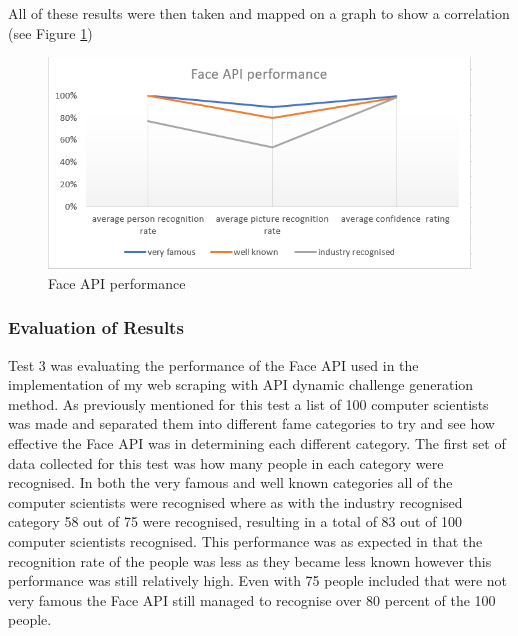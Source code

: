 \documentclass[12pt,a4paper]{article}
\begin{document}
All of these results were then taken and mapped on a graph to show a correlation (see Figure \ref{fer4}) 

\begin{figure}[!ht]
    \centering
    \includegraphics[width=1.0\textwidth]{Figs/faceevalr4.PNG} 
    \caption{Face API performance} 
    \label{fer4}
\end{figure}  



\subsubsection{Evaluation of Results} 
Test 3 was evaluating the performance of the Face API used in the implementation of my web scraping with API dynamic challenge generation method. 
As previously mentioned for this test a list of 100 computer scientists was made and separated them into different fame categories to try and see how effective the Face API was in determining each different category. The first set of data collected for this test was how many people in each category were recognised. In both the very famous and well known categories all of the computer scientists were recognised where as with the industry recognised category 58 out of 75 were recognised, resulting in a total of 83 out of 100 computer scientists recognised. This performance was as expected in that the recognition rate of the people was less as they became less known however this performance was still relatively high. Even with 75 people included that were not very famous the Face API still managed to recognise over 80 percent of the 100 people.  
\end{document}
